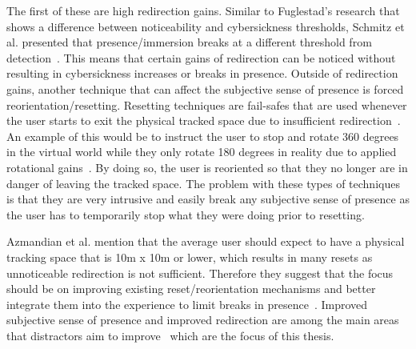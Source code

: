 The first of these are high redirection gains. Similar to Fuglestad's research that shows a difference between noticeability and cybersickness thresholds, Schmitz et al. presented that presence/immersion breaks at a different threshold from detection~\cite{schmitz2018you}. This means that certain gains of redirection can be noticed without resulting in cybersickness increases or breaks in presence.
Outside of redirection gains, another technique that can affect the subjective sense of presence is forced reorientation/resetting. Resetting techniques are fail-safes that are used whenever the user starts to exit the physical tracked space due to insufficient redirection~\cite{williams2007exploring}. An example of this would be to instruct the user to stop and rotate 360 degrees in the virtual world while they only rotate 180 degrees in reality due to applied rotational gains~\cite{suma2012taxonomy}. By doing so, the user is reoriented so that they no longer are in danger of leaving the tracked space. The problem with these types of techniques is that they are very intrusive and easily break any subjective sense of presence as the user has to temporarily stop what they were doing prior to resetting. 

Azmandian et al. mention that the average user should expect to have a physical tracking space that is 10m x 10m or lower, which results in many resets as unnoticeable redirection is not sufficient. Therefore they suggest that the focus should be on improving existing reset/reorientation mechanisms and better integrate them into the experience to limit breaks in presence~\cite{azmandian2015physical}. Improved subjective sense of presence and improved redirection are among the main areas that distractors aim to improve~\cite{peck2009evaluation, peck2011evaluation} which are the focus of this thesis.

